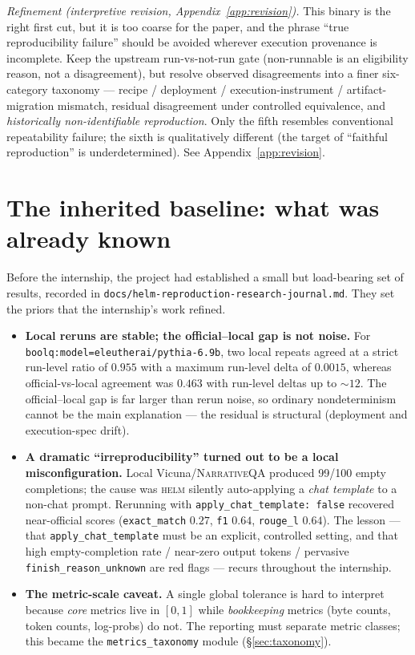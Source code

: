 \documentclass[11pt]{report}
\newcommand{\code}[1]{\texttt{#1}}
\newcommand{\file}[1]{\texttt{#1}}
\begin{document}
\emph{Refinement (interpretive revision, Appendix~\ref{app:revision}).} This binary
is the right first cut, but it is too coarse for the paper, and the phrase ``true
reproducibility failure'' should be avoided wherever execution provenance is
incomplete. Keep the upstream run-vs-not-run gate (non-runnable is an eligibility
reason, not a disagreement), but resolve observed disagreements into a finer
six-category taxonomy --- recipe / deployment / execution-instrument /
artifact-migration mismatch, residual disagreement under controlled equivalence, and
\emph{historically non-identifiable reproduction}. Only the fifth resembles
conventional repeatability failure; the sixth is qualitatively different (the target
of ``faithful reproduction'' is underdetermined). See Appendix~\ref{app:revision}.

\section{The inherited baseline: what was already known}
\label{sec:inherited}

Before the internship, the project had established a small but load-bearing set of
results, recorded in \file{docs/helm-reproduction-research-journal.md}. They set
the priors that the internship's work refined.

\begin{itemize}
  \item \textbf{Local reruns are stable; the official--local gap is not noise.} For
        \code{boolq:model=eleutherai/pythia-6.9b}, two local repeats agreed at a
        strict run-level ratio of $0.955$ with a maximum run-level delta of
        $0.0015$, whereas official-vs-local agreement was $0.463$ with run-level
        deltas up to $\sim\!12$. The official--local gap is far larger than
        rerun noise, so ordinary nondeterminism cannot be the main explanation ---
        the residual is structural (deployment and execution-spec drift).
  \item \textbf{A dramatic ``irreproducibility'' turned out to be a local
        misconfiguration.} Local Vicuna/\textsc{NarrativeQA} produced 99/100 empty
        completions; the cause was \textsc{helm} silently auto-applying a
        \emph{chat template} to a non-chat prompt. Rerunning with
        \code{apply\_chat\_template: false} recovered near-official scores
        (\code{exact\_match} $0.27$, \code{f1} $0.64$, \code{rouge\_l} $0.64$).
        The lesson --- that \code{apply\_chat\_template} must be an explicit,
        controlled setting, and that high empty-completion rate / near-zero output
        tokens / pervasive \code{finish\_reason\_unknown} are red flags --- recurs
        throughout the internship.
  \item \textbf{The metric-scale caveat.} A single global tolerance is hard to
        interpret because \emph{core} metrics live in $[0,1]$ while
        \emph{bookkeeping} metrics (byte counts, token counts, log-probs) do not.
        The reporting must separate metric classes; this became the
        \code{metrics\_taxonomy} module (\S\ref{sec:taxonomy}).
\end{itemize}
\end{document}
